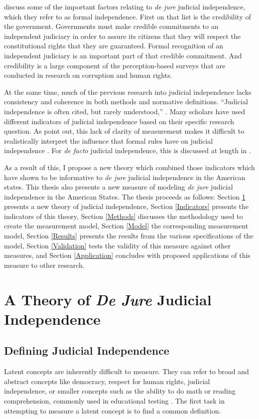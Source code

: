 \documentclass[12pt]{article}
\begin{document}
\citet{Hayo2007} discuss some of the important factors relating to \textit{de jure} judicial independence, which they refer to as formal independence.  First on that list is the credibility of the government.  Governments must make credible commitments to an independent judiciary in order to assure its citizens that they will respect the constitutional rights that they are guaranteed.  Formal recognition of an independent judiciary is an important part of that credible commitment.   And credibility is a large component of the perception-based surveys that are conducted in research on corruption and human rights.

At the same time, much of the previous research into judicial independence lacks consistency and coherence in both methods and normative definitions.  ``Judicial independence is often cited, but rarely understood,'' \citep[1]{Tiede2006}.  Many scholars have used different indicators of judicial independence based on their specific research question.  As \citeauthor{Rios2014} point out, this lack of clarity of measurement makes it difficult to realistically interpret the influence that formal rules have on judicial independence \citep[2]{Rios2014}.  For \textit{de facto} judicial independence, this is discussed at length in \cite{Rios2014}.  

As a result of this, I propose a new theory which combined those indicators which have shown to be informative to \textit{de jure} judicial independence in the American states.  This thesis also presents a new measure of modeling \textit{de jure} judicial independence in the American States.  The thesis proceeds as follows: Section \ref{Theory} presents a new theory of judicial independence, Section \ref{Indicators} presents the indicators of this theory, Section \ref{Methods} discusses the methodology used to create the measurement model, Section \ref{Model} the corresponding measurement model, Section \ref{Results} presents the results from the various specifications of the model, Section \ref{Validation} tests the validity of this measure against other measures, and Section \ref{Application} concludes with proposed applications of this measure to other research.	

\section{A Theory of \textit{De Jure} Judicial Independence}\label{Theory}
\subsection*{Defining Judicial Independence}%
Latent concepts are inherently difficult to measure.  They can refer to broad and abstract concepts like democracy, respect for human rights, judicial independence, or smaller concepts such as the ability to do math or reading comprehension, commonly used in educational testing \citep{Jackman2008, Treier2008,Schnakenberg2014,Linzer2014}.  The first task in attempting to measure a latent concept is to find a common definition.  
\end{document}
